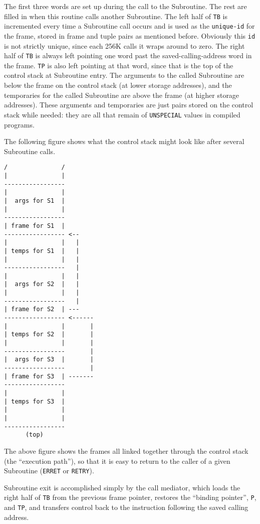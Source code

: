 \documentclass[a4paper,]{article}
\begin{document}
The first three words are set up during the call to the Subroutine. The rest are filled in when this routine calls another
Subroutine. The left half of \texttt{TB} is incremented every time a Subroutine call occurs and is used as the
\texttt{unique-id} for the frame, stored in frame and tuple pairs as mentioned before. Obviously this \texttt{id} is not
strictly unique, since each 256K calls it wraps around to zero. The right half of \texttt{TB} is always left pointing one
word past the saved-calling-address word in the frame. \texttt{TP} is also left pointing at that word, since that is the
top of the control stack at Subroutine entry. The arguments to the called Subroutine are below the frame on the control
stack (at lower storage addresses), and the temporaries for the called Subroutine are above the frame (at higher storage
addresses). These arguments and temporaries are just pairs stored on the control stack while needed: they are all that
remain of \texttt{UNSPECIAL} values in compiled programs.

The following figure shows what the control stack might look like after several Subroutine calls.

\begin{verbatim}
/               /
|               |
-----------------
|               |
|  args for S1  |
|               |
-----------------
| frame for S1  |
----------------- <--
|               |   |
| temps for S1  |   |
|               |   |
-----------------   |
|               |   |
|  args for S2  |   |
|               |   |
-----------------   |
| frame for S2  | ---
----------------- <------
|               |       |
| temps for S2  |       |
|               |       |
-----------------       |
|  args for S3  |       |
-----------------       |
| frame for S3  | -------
-----------------
|               |
| temps for S3  |
|               |
|               |
-----------------
      (top)
\end{verbatim}

The above figure shows the frames all linked together through the control stack (the ``execution path''), so that it is
easy to return to the caller of a given Subroutine (\texttt{ERRET} or
\texttt{RETRY}).

Subroutine exit is accomplished simply by the call mediator, which loads the right half of \texttt{TB} from the previous
frame pointer, restores the ``binding pointer'', \texttt{P}, and \texttt{TP}, and transfers control back to the instruction
following the saved calling address.
\end{document}
